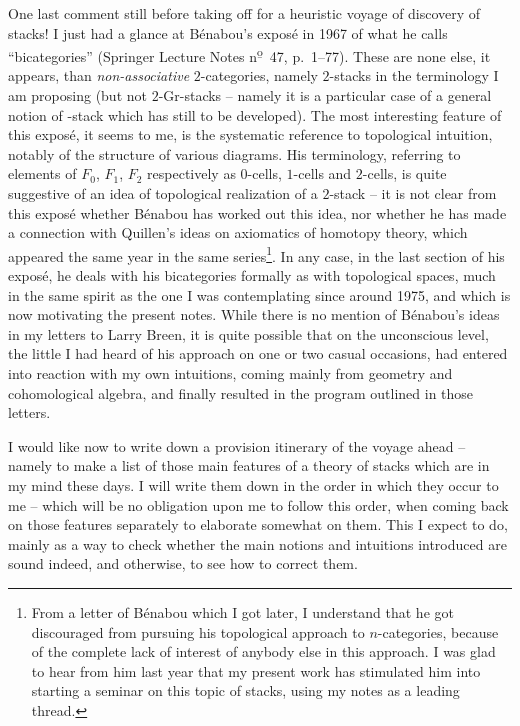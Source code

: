 One last comment still before taking off for a heuristic voyage of
discovery of stacks! I just had a glance at Bénabou's exposé in
1967 of what he calls ``bicategories'' (Springer Lecture Notes
n\textsuperscript{\b o}~47, p.~1--77). These are none else, it appears,
than \emph{non-associative} $2$-categories, namely $2$-stacks in the
terminology I am proposing (but not $2$-Gr-stacks -- namely it is a
particular case of a general notion of \oo-stack which has still to be
developed). The most interesting feature of this expos\'e, it seems to
me, is the systematic reference to topological intuition, notably of
the structure of various diagrams. His terminology, referring to
elements of $F_0$, $F_1$, $F_2$ respectively as $0$-cells, $1$-cells
and $2$-cells, is quite suggestive of an idea of topological
realization of a $2$-stack -- it is not clear from this expos\'e
whether B\'enabou has worked out this idea, nor whether he has made a
connection with Quillen's ideas on axiomatics of homotopy theory,
which appeared the same year in the same series\footnote{From a letter of Bénabou which I got later, I understand that he got discouraged from pursuing his topological approach to $n$-categories, because of the complete lack of interest of anybody else in this approach. I was glad to hear from him last year that my present work has stimulated him into starting a seminar on this topic of stacks, using my notes as a leading thread.}. In any case, in the
last section of his expos\'e, he deals with his bicategories formally
as with topological spaces, much in the same spirit as the one I was
contemplating since around 1975, and which is now motivating the
present notes. While there is no mention of B\'enabou's ideas in my
letters to Larry Breen, it is quite possible that on the unconscious
level, the little I had heard of his approach on one or two casual
occasions, had entered into reaction with my own intuitions, coming
mainly from geometry and cohomological algebra, and finally resulted
in the program outlined in those letters.

\label{sec:19}%
I would like now to write down a provision itinerary of
the voyage ahead -- namely to make a list of those main features of a
theory of stacks which are in my mind these days. I will write them
down in the order in which they occur to me -- which will be no
obligation upon me to follow this order, when coming back on those
features separately to elaborate somewhat on them. This I expect to
do, mainly as a way to check whether the main notions and intuitions
introduced are sound indeed, and otherwise, to see how to correct
them.

